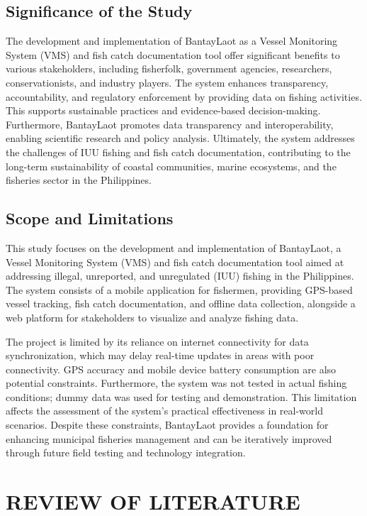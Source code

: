 \documentclass{icsthesis}
\begin{document}
\begin{mainmatter}
		    \subsection{Significance of the Study}
            The development and implementation of BantayLaot as a Vessel Monitoring System (VMS) and fish catch documentation tool offer significant benefits to various stakeholders, including fisherfolk, government agencies, researchers, conservationists, and industry players. The system enhances transparency, accountability, and regulatory enforcement by providing data on fishing activities. This supports sustainable practices and evidence-based decision-making. Furthermore, BantayLaot promotes data transparency and interoperability, enabling scientific research and policy analysis. Ultimately, the system addresses the challenges of IUU fishing and fish catch documentation, contributing to the long-term sustainability of coastal communities, marine ecosystems, and the fisheries sector in the Philippines.
            \subsection{Scope and Limitations}
            This study focuses on the development and implementation of BantayLaot, a Vessel Monitoring System (VMS) and fish catch documentation tool aimed at addressing illegal, unreported, and unregulated (IUU) fishing in the Philippines. The system consists of a mobile application for fishermen, providing GPS-based vessel tracking, fish catch documentation, and offline data collection, alongside a web platform for stakeholders to visualize and analyze fishing data.
            
            The project is limited by its reliance on internet connectivity for data synchronization, which may delay real-time updates in areas with poor connectivity. GPS accuracy and mobile device battery consumption are also potential constraints. Furthermore, the system was not tested in actual fishing conditions; dummy data was used for testing and demonstration. This limitation affects the assessment of the system’s practical effectiveness in real-world scenarios. Despite these constraints, BantayLaot provides a foundation for enhancing municipal fisheries management and can be iteratively improved through future field testing and technology integration.
		
		\section{REVIEW OF LITERATURE}

\end{mainmatter}
\end{document}
